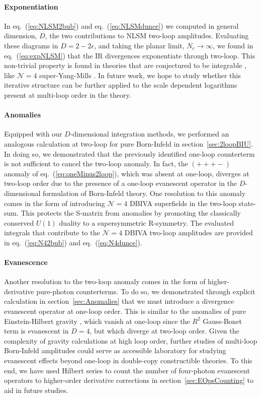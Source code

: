 \documentclass[12pt,letter]{article}
\def\sect#1{section~\ref{#1}}
\def\eqn#1{eq.~(\ref{#1})}
\begin{document}
\paragraph{\textbf{Exponentiation}} In \eqn{eq:NLSM2bub} and \eqn{eq:NLSMdunce} we computed in general dimension, $D$, the two contributions to NLSM two-loop amplitudes. Evaluating these diagrams in $D=2-2\epsilon$, and taking the planar limit, $N_c \rightarrow \infty$, we found in \eqn{eq:expNLSM} that the IR divergences exponentiate through two-loop. This non-trivial property is found in theories that are conjectured to be integrable \cite{Shankar:1977cm,Zamolodchikov:1977nu,Zamolodchikov:1978xm, Komatsu:2019hgc}, like $\mathcal{N}=4$ super-Yang-Mills \cite{Anastasiou:2003kj,Bern:2005iz}. In future work, we hope to study whether this iterative structure can be further applied to the scale dependent logarithms present at multi-loop order in the theory. 
\paragraph{\textbf{Anomalies}} Equipped with our $D$-dimensional integration methods, we performed an analogous calculation at two-loop for pure Born-Infeld in \sect{sec:2loopBIU}. In doing so, we demonstrated that the previously identified one-loop counterterm is not sufficient to cancel the two-loop anomaly. In fact, the $(+++-)$ anomaly of \eqn{eq:oneMinus2loop}, which was absent at one-loop, diverges at two-loop order due to the presence of a one-loop evanescent operator in the $D$-dimensional formulation of Born-Infeld theory. One resolution to this anomaly comes in the form of introducing $\mathcal{N}=4$ DBIVA superfields in the two-loop state-sum. This protects the S-matrix from anomalies by promoting the classically conserved $U(1)$ duality to a supersymmetric R-symmetry. The evaluated integrals that contribute to the $\mathcal{N}=4$ DBIVA two-loop amplitudes are provided in \eqn{eq:N42bub} and \eqn{eq:N4dunce}. 
\paragraph{\textbf{Evanescence}}Another resolution to the two-loop anomaly comes in the form of higher-derivative pure-photon counterterms. To do so, we demonstrated through explicit calculation in \sect{sec:Anomalies} that we must introduce a divergence evanescent operator at one-loop order. This is similar to the anomalies of pure Einstein-Hilbert gravity \cite{Duff:1980qv,Bern:2017puu}, which vanish at one-loop since the $R^2$ Gauss-Bonet term is evanescent in $D=4$, but which diverge at two-loop order. Given the complexity of gravity calculations at high loop order, further studies of multi-loop Born-Infeld amplitudes could serve as accessible laboratory for studying evanescent effects beyond one-loop in double-copy constructible theories. To this end, we have used Hilbert series to count the number of four-photon evanescent operators to higher-order derivative corrections in \sect{sec:EOpsCounting} to aid in future studies. 
\end{document}
